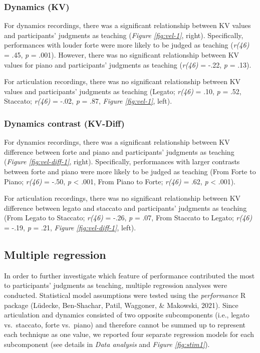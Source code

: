 \documentclass[
  man,floatsintext]{apa6}
\begin{document}
\hypertarget{dynamics-kv}{%
\subsubsection{Dynamics (KV)}\label{dynamics-kv}}

For dynamics recordings, there was a significant relationship between KV values and participants' judgments as teaching (\emph{Figure \ref{fig:vel-1}}, right). Specifically, performances with louder forte were more likely to be judged as teaching (\emph{r(46)} = .45, \emph{p} = .001). However, there was no significant relationship between KV values for piano and participants' judgments as teaching (\emph{r(46)} = -.22, \emph{p} = .13).

For articulation recordings, there was no significant relationship between KV values and participants' judgments as teaching (Legato; \emph{r(46)} = .10, \emph{p} = .52, Staccato; \emph{r(46)} = -.02, \emph{p} = .87, \emph{Figure \ref{fig:vel-1}}, left).

\hypertarget{dynamics-contrast-kv-diff}{%
\subsubsection{Dynamics contrast (KV-Diff)}\label{dynamics-contrast-kv-diff}}

For dynamics recordings, there was a significant relationship between KV difference between forte and piano and participants' judgments as teaching (\emph{Figure \ref{fig:vel-diff-1}}, right). Specifically, performances with larger contrasts between forte and piano were more likely to be judged as teaching (From Forte to Piano; \emph{r(46)} = -.50, \emph{p} \textless{} .001, From Piano to Forte; \emph{r(46)} = .62, \emph{p} \textless{} .001).

For articulation recordings, there was no significant relationship between KV difference between legato and staccato and participants' judgments as teaching (From Legato to Staccato; \emph{r(46)} = -.26, \emph{p} = .07, From Staccato to Legato; \emph{r(46)} = -.19, \emph{p} = .21, \emph{Figure \ref{fig:vel-diff-1}}, left).

\hypertarget{multiple-regression}{%
\subsection{Multiple regression}\label{multiple-regression}}

In order to further investigate which feature of performance contributed the most to participants' judgments as teaching, multiple regression analyses were conducted. Statistical model assumptions were tested using the \emph{performance} R package (Lüdecke, Ben-Shachar, Patil, Waggoner, \& Makowski, 2021). Since articulation and dynamics consisted of two opposite subcomponents (i.e., legato vs.~staccato, forte vs.~piano) and therefore cannot be summed up to represent each technique as one value, we reported four separate regression models for each subcomponent (see details in \emph{Data analysis} and \emph{Figure \ref{fig:stim1}}).
\end{document}
